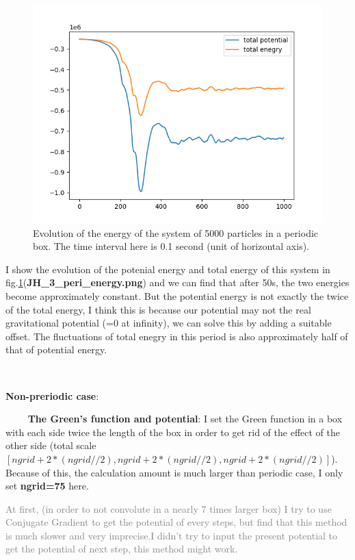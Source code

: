 \documentclass[showpacs, oneside, onecolumn, prl, amsmath, amssymb, nofootinbib, superscriptaddress, notitlepage]{revtex4-1}
\newcommand\bfig{\begin{figure}}
\newcommand\efig{\end{figure}}
\newcommand\gray{\textcolor{gray}}
\begin{document}
\bfig
	\centering
	\includegraphics[scale=1]{JH_3_peri_energy.png}
	\caption{Evolution of the energy of the system of 5000 particles in a periodic box. The time interval here is 0.1 second (unit of horizontal axis).}
	\label{3-peri-energy}
\efig

I show the evolution of the potenial energy and total energy of this system in fig.\ref{3-peri-energy}(\textbf{JH\_3\_peri\_energy.png}) and we can find that after 50s, the two energies become approximately constant. But the potential energy is not exactly the twice of the total energy, I think this is because our potential may not the real gravitational potential (=0 at infinity), we can solve this by adding a suitable offset. The fluctuations of total enegry in this period is also approximately half of that of potential energy.


~~~~

\textbf{Non-preriodic case}: 

~~~~
\textbf{The Green's function and potential}: I set the Green function in a box with each side twice the length of the box in order to get rid of the effect of the other side (total scale $[ngrid+2*(ngrid//2),ngrid+2*(ngrid//2),ngrid+2*(ngrid//2)]$). \newline
Because of this, the calculation amount is much larger than periodic case, I only set \textbf{ngrid=75} here.

\gray{At first, (in order to not convolute in a nearly 7 times larger box) I try to use Conjugate Gradient to get the potential of every steps, but find that this method is much slower and very imprecise.\newline I didn't try to input the present potential to get the potential of next step, this method might work.}
\end{document}
